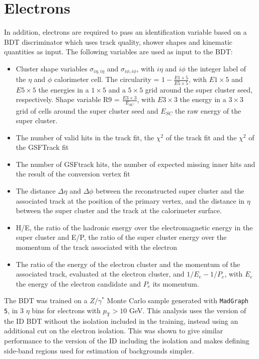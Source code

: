 \section{Electrons}

In addition, electrons are required to pass an identification variable based on a \ac{BDT} discriminator which uses track quality, shower shapes and kinematic quantities as input.
The following variables are used as input to the BDT:  ~\cite{cmsElectron}
\begin{itemize}
\item Cluster shape variables $\sigma_{i\eta,i\eta}$ and $\sigma_{i\phi,i\phi}$, with $i\eta$ and $i\phi$ the integer
label of the $\eta$ and $\phi$ calorimeter cell. The circularity =  $1 -\frac{E1\times5}{E5\times5}$, with
$E1\times5$ and $E5\times5$ the energies in a $1\times5$ and a $5\times5$ grid around the super cluster seed,
respectively. Shape variable R9 = $\frac{E3\times3}{E_{SC}}$, with $E3\times3$ the energy in a $3\times3$ grid
of cells around the super cluster seed and $E_{SC}$ the raw energy of the super cluster.
\item The number of valid hits in the track fit, the $\chi^2$ of the track fit and the $\chi^2$ of the GSFTrack fit
\item The number of GSFtrack hits, the number of expected missing inner hits and the result of the conversion vertex fit
\item The distance $\Delta \eta$ and $\Delta \phi$ between the reconstructed super cluster and the associated track at the position of the primary vertex, and the distance in $\eta$ between the super cluster and the track at the calorimeter surface.
\item H/E, the ratio of the hadronic energy over the electromagnetic energy in the super cluster and E/P, the ratio of the super cluster energy over the momentum of the track associated with the electron 
\item The ratio of the energy of the electron cluster and the momentum of the associated track, evaluated at the electron cluster,
 and $1/E_e - 1/P_e$, with $E_e$ the energy of the electron candidate and $P_e$ its momentum.
\end{itemize}
The BDT was trained on a $Z/\gamma^{*}$ Monte Carlo sample generated with
\texttt{MadGraph 5}, in 3 $\eta$ bins for electrons with $p_{\text{T}}>10$ GeV.
This analysis uses the version of the ID BDT without the isolation included in
the training, instead using an additional cut on the electron isolation. This
was shown to give similar performance to the version of the ID including the
isolation and makes defining side-band regions used for estimation of
backgrounds simpler.

